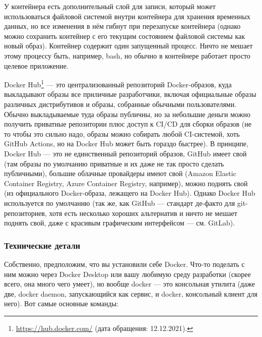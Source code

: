 \documentclass{../../text-style}
\begin{document}
У контейнера есть дополнительный слой для записи, который может использоваться файловой системой внутри контейнера для хранения временных данных, но все изменения в нём гибнут при перезапуске контейнера (однако можно сохранить контейнер с его текущим состоянием файловой системы как новый образ). Контейнер содержит один запущенный процесс. Ничто не мешает этому процессу быть, например, bash, но обычно в контейнере работает просто целевое приложение.

Docker Hub\footnote{\url{https://hub.docker.com/} (дата обращения: 12.12.2021).} --- это централизованный репозиторий Docker-образов, куда выкладывают образы все приличные разработчики, включая официальные образы различных дистрибутивов и образы, собранные обычными пользователями. Обычно выкладываемые туда образы публичны, но за небольшие деньги можно получить приватные репозитории плюс доступ к CI/CD для сборки образов (не то чтобы это сильно надо, образы можно собирать любой CI-системой, хоть GitHub Actions, но на Docker Hub может быть гораздо быстрее). В принципе, Docker Hub --- это не единственный репозиторий образов, GitHub имеет свой (там образы по умолчанию приватные и их даже не так просто сделать публичными), большие облачные провайдеры имеют свой (Amazon Elastic Container Registry, Azure Container Registry, например), можно поднять свой (из официального Docker-образа, лежащего на Docker Hub). Однако Docker Hub используется по умолчанию (так же, как GitHub --- стандарт де-факто для git-репозиториев, хотя есть несколько хороших альтернатив и ничто не мешает поднять свой, даже с красивым графическим интерфейсом --- см. GitLab).

\subsubsection{Технические детали}

Собственно, предположим, что вы установили себе Docker. Что-то поделать с ним можно через Docker Desktop или вашу любимую среду разработки (скорее всего, она много чего умеет), но вообще docker --- это консольная утилита (даже две, docker daemon, запускающийся как сервис, и docker, консольный клиент для него). Вот самые основные команды:
\end{document}
